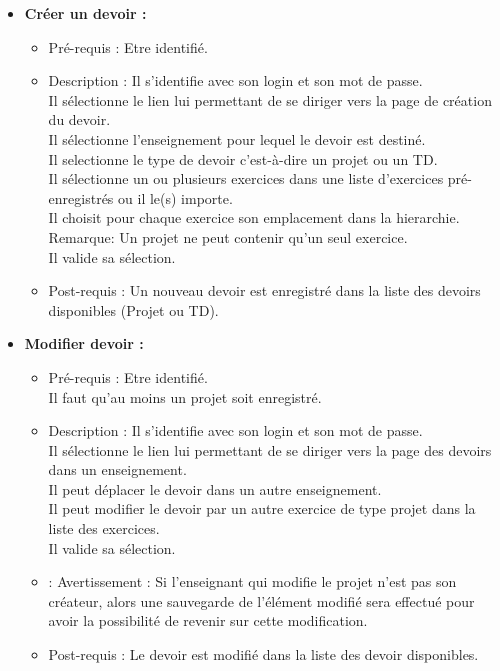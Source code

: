\begin{itemize}
\item {\bf Cr{\'e}er un devoir :}
	\begin{itemize}
	\item Pr{\'e}-requis : Etre identifi{\'e}.
	\item Description : Il s'identifie avec son login et son mot de passe.\\
	Il s{\'e}lectionne le lien lui permettant de se diriger vers la page de cr{\'e}ation du devoir.\\
	Il s{\'e}lectionne l'enseignement pour lequel le devoir est destin{\'e}.\\
	Il selectionne le type de devoir c'est-{\`a}-dire un projet ou un TD.\\
	Il s{\'e}lectionne un ou plusieurs exercices dans une liste d'exercices pr{\'e}-enregistr{\'e}s ou il le(s) importe.\\
	Il choisit pour chaque exercice son emplacement dans la hierarchie.\\
	Remarque: Un projet ne peut contenir qu'un seul exercice.\\  
	Il valide sa s{\'e}lection.
	\item Post-requis : Un nouveau devoir est enregistr{\'e} dans la liste des devoirs disponibles (Projet ou TD).
	\end{itemize}

\item {\bf Modifier devoir :}
	\begin{itemize}
	\item Pr{\'e}-requis : Etre identifi{\'e}.\\
	Il faut qu'au moins un projet soit enregistr{\'e}.
	\item Description : Il s'identifie avec son login et son mot de passe.\\
	Il s{\'e}lectionne le lien lui permettant de se diriger vers la page des devoirs dans un enseignement.\\
	Il peut d{\'e}placer le devoir dans un autre enseignement. \\
	Il peut modifier le devoir par un autre exercice de type projet dans la liste des exercices.\\
	Il valide sa s{\'e}lection.
	\item : Avertissement : Si l'enseignant qui modifie le projet n'est pas son cr{\'e}ateur, alors une sauvegarde de l'{\'e}l{\'e}ment modifi{\'e} sera effectu{\'e} pour avoir la possibilit{\'e} de revenir sur cette modification.
	\item Post-requis : Le devoir est modifi{\'e} dans la liste des devoir disponibles.
	\end{itemize}


\end{itemize}
